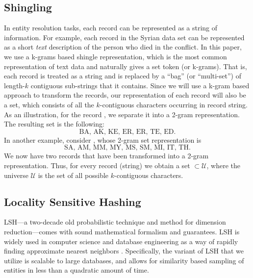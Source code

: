 \documentclass{imsart}
\begin{document}
\subsection{Shingling}
In entity resolution tasks, each record can be represented as a string of information. For example, each record in the Syrian data set can be represented as a short \textit{text} description of the person who died in the conflict. In this paper, we use a k-grams based shingle representation, which is the most common representation of text data and naturally gives a set token (or k-grams).
That is, each record is treated as a string and is replaced by a ``bag'' (or ``multi-set'') of length-$k$ contiguous sub-strings that it contains. Since we will use a k-gram based approach to transform the records, our representation of each record will also be a set, which consists of all the $k$-contiguous characters occurring in record string. As an illustration, for the record , we separate it into a 2-gram representation. The resulting set is the following: $$\text{BA, AK, KE, ER, ER, TE, ED}.$$ In another example, consider , whose 2-gram set representation is $$\text{SA, AM, MM, MY, MS, SM, MI, IT, TH}.$$ We now have two records that have been transformed into a 2-gram representation. Thus, for every record (string) we obtain a set $\subset \mathcal{U}$, where the universe $\mathcal{U}$ is the set of all possible $k$-contiguous characters.


\subsection{Locality Sensitive Hashing}
LSH---a two-decade old probabilistic technique and method for dimension reduction---comes with sound mathematical formalism and guarantees. LSH is widely used in computer science and database engineering as a way of rapidly finding approximate nearest neighbors \citep{Proc:Indyk_STOC98,gionis_1999}. Specifically, the variant of LSH that we utilize is scalable to large databases, and allows for similarity based sampling of entities in less than a quadratic amount of time.
\end{document}
